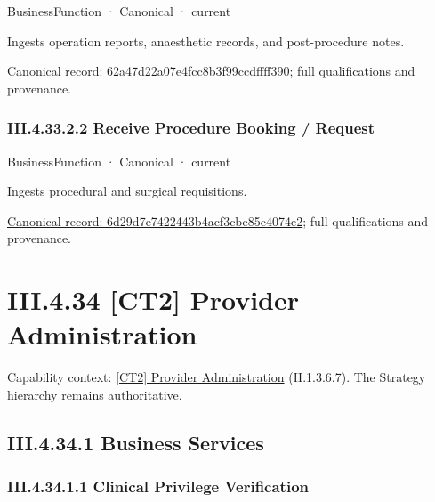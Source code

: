 \label{element:62a47d22a07e4fcc8b3f99ccdffff390}
{\small BusinessFunction · Canonical · current}\par

Ingests operation reports, anaesthetic records, and post-procedure notes.


{\footnotesize \href{../../../../continuum/business/business-function/62a47d22a07e4fcc8b3f99ccdffff390.md}{Canonical record: 62a47d22a07e4fcc8b3f99ccdffff390}; full qualifications and provenance.}\par
\subsubsection*{III.4.33.2.2 Receive Procedure Booking / Request}
\label{navigation:III.4.33.2.2}

\label{element:6d29d7e7422443b4acf3cbe85c4074e2}
{\small BusinessFunction · Canonical · current}\par

Ingests procedural and surgical requisitions.


{\footnotesize \href{../../../../continuum/business/business-function/6d29d7e7422443b4acf3cbe85c4074e2.md}{Canonical record: 6d29d7e7422443b4acf3cbe85c4074e2}; full qualifications and provenance.}\par
\section*{III.4.34 [CT2] Provider Administration}
\label{navigation:III.4.34}

{\small Capability context: \hyperref[element:d6312f85968a4209bafff5ed009297a6]{[CT2] Provider Administration} (II.1.3.6.7). The Strategy hierarchy remains authoritative.}\par
\subsection*{III.4.34.1 Business Services}
\label{navigation:III.4.34.1}

\subsubsection*{III.4.34.1.1 Clinical Privilege Verification}
\label{navigation:III.4.34.1.1}

